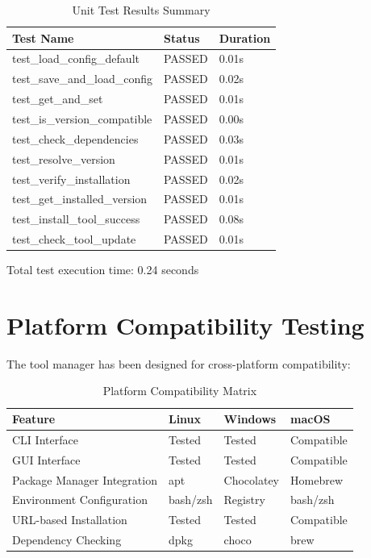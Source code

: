 \documentclass[12pt,a4paper]{report}
\begin{document}
\begin{table}[H]
    \centering
    \begin{tabular}{|m{6cm}|m{3cm}|m{4cm}|}
        \hline
        \textbf{Test Name} & \textbf{Status} & \textbf{Duration} \\
        \hline
        test\_load\_config\_default & PASSED & 0.01s \\
        \hline
        test\_save\_and\_load\_config & PASSED & 0.02s \\
        \hline
        test\_get\_and\_set & PASSED & 0.01s \\
        \hline
        test\_is\_version\_compatible & PASSED & 0.00s \\
        \hline
        test\_check\_dependencies & PASSED & 0.03s \\
        \hline
        test\_resolve\_version & PASSED & 0.01s \\
        \hline
        test\_verify\_installation & PASSED & 0.02s \\
        \hline
        test\_get\_installed\_version & PASSED & 0.01s \\
        \hline
        test\_install\_tool\_success & PASSED & 0.08s \\
        \hline
        test\_check\_tool\_update & PASSED & 0.01s \\
        \hline
    \end{tabular}
    \caption{Unit Test Results Summary}
    \label{tab:test_results}
\end{table}

Total test execution time: 0.24 seconds

\section{Platform Compatibility Testing}
The tool manager has been designed for cross-platform compatibility:

\begin{table}[H]
    \centering
    \begin{tabular}{|m{3cm}|m{3cm}|m{3cm}|m{3cm}|}
        \hline
        \textbf{Feature} & \textbf{Linux} & \textbf{Windows} & \textbf{macOS} \\
        \hline
        CLI Interface & Tested & Tested & Compatible \\
        \hline
        GUI Interface & Tested & Tested & Compatible \\
        \hline
        Package Manager Integration & apt & Chocolatey & Homebrew \\
        \hline
        Environment Configuration & bash/zsh & Registry & bash/zsh \\
        \hline
        URL-based Installation & Tested & Tested & Compatible \\
        \hline
        Dependency Checking & dpkg & choco & brew \\
        \hline
    \end{tabular}
    \caption{Platform Compatibility Matrix}
    \label{tab:platform}
\end{table}
\end{document}

